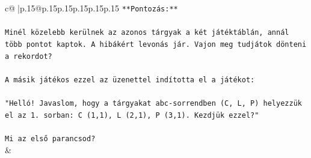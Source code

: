 \documentclass{article}
\begin{document}
{\begin{supertabular}{c@{$\;$}|p{.15\linewidth}@{}p{.15\linewidth}p{.15\linewidth}p{.15\linewidth}p{.15\linewidth}p{.15\linewidth}}
{{{\texttt{**Pontozás:**} \\
\\ 
\texttt{Minél közelebb kerülnek az azonos tárgyak a két játéktáblán, annál több pontot kaptok. A hibákért levonás jár. Vajon meg tudjátok dönteni a rekordot?} \\
\\ 
\texttt{A másik játékos ezzel az üzenettel indította el a játékot:} \\
\\ 
\texttt{"Helló! Javaslom, hogy a tárgyakat abc{-}sorrendben (C, L, P) helyezzük el az 1. sorban: C (1,1), L (2,1), P (3,1). Kezdjük ezzel?"} \\
\\ 
\texttt{Mi az első parancsod?} \\
            }
        }
    }
    & \\ \\


\end{supertabular}}
\end{document}
